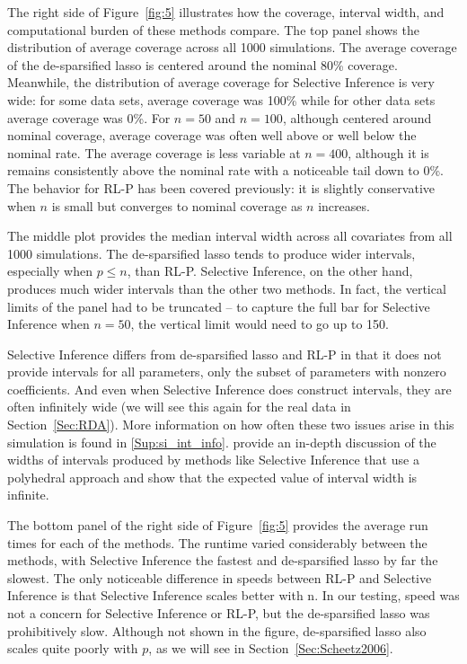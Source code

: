 The right side of Figure~\ref{fig:5} illustrates how the coverage, interval width, and computational burden of these methods compare. The top panel shows the distribution of average coverage across all 1000 simulations. The average coverage of the de-sparsified lasso is centered around the nominal 80\% coverage. Meanwhile, the distribution of average coverage for Selective Inference is very wide: for some data sets, average coverage was 100\% while for other data sets average coverage was 0\%. For $n = 50$ and $n = 100$, although centered around nominal coverage, average coverage was often well above or well below the nominal rate. The average coverage is less variable at $n = 400$, although it is remains consistently above the nominal rate with a noticeable tail down to 0\%. The behavior for RL-P has been covered previously: it is slightly conservative when $n$ is small but converges to nominal coverage as $n$ increases.

The middle plot provides the median interval width across all covariates from all 1000 simulations. The de-sparsified lasso tends to produce wider intervals, especially when $p \le n$, than RL-P. Selective Inference, on the other hand, produces much wider intervals than the other two methods. In fact, the vertical limits of the panel had to be truncated -- to capture the full bar for Selective Inference when $n = 50$, the vertical limit would need to go up to 150.

Selective Inference differs from de-sparsified lasso and RL-P in that it does not provide intervals for all parameters, only the subset of parameters with nonzero coefficients. And even when Selective Inference does construct intervals, they are often infinitely wide (we will see this again for the real data in Section~\ref{Sec:RDA}). More information on how often these two issues arise in this simulation is found in \ref{Sup:si_int_info}. \citet{Kivaranovic2021} provide an in-depth discussion of the widths of intervals produced by methods like Selective Inference that use a polyhedral approach and show that the expected value of interval width is infinite.

The bottom panel of the right side of Figure~\ref{fig:5} provides the average run times for each of the methods. The runtime varied considerably between the methods, with Selective Inference the fastest and de-sparsified lasso by far the slowest.  The only noticeable difference in speeds between RL-P and Selective Inference is that Selective Inference scales better with n. In our testing, speed was not a concern for Selective Inference or RL-P, but the de-sparsified lasso was prohibitively slow. Although not shown in the figure, de-sparsified lasso also scales quite poorly with $p$, as we will see in Section~\ref{Sec:Scheetz2006}.


